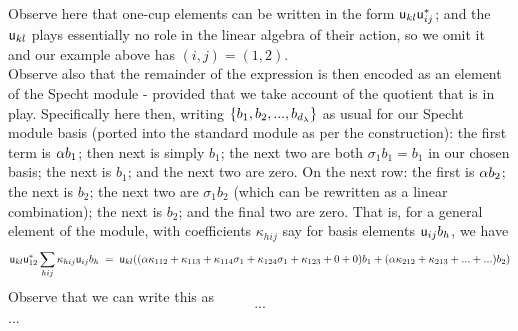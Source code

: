 {\hspace{-2.81cm} 
  \;
    \;
  \;
  \;
   \;  
  \;


\medskip 

\noindent 
Observe here that one-cup elements can be written in the form ${\mathsf u}_{kl} {\mathsf u}_{ij}^*$; 
and the ${\mathsf u}_{kl}$ plays essentially no role in the linear algebra of their action, so 
we omit it and our example above has $(i,j)=(1,2)$. 
\\ 
Observe also that 
the remainder of the expression is then encoded as an element of the Specht module 
- provided that we take account of the quotient that is in play. 
Specifically here then, writing $\{ b_1, b_2 ,..., b_{d_\lambda} \}$ as usual for our Specht module basis (ported into the standard module as per the construction):  
the first term is $\alpha b_1$; 
then next is simply $b_1$; 
the next two are both $\sigma_1 b_1 = b_1$ in our chosen basis; 
the next is $b_1$; and 
the next two are zero. 
On the next row: the first is $\alpha b_2$; 
the next is $b_2$; 
the next two are $\sigma_1 b_2$ (which can be rewritten as a linear combination); 
the next is $b_2$; and the final two are zero. 
That is, for a general element of the module, with coefficients $\kappa_{hij}$ say for basis elements ${\mathsf u}_{ij} b_h$, we have  
\[
{\mathsf u}_{kl} {\mathsf u}_{12}^* \sum_{hij} \kappa_{hij} {\mathsf u}_{ij} b_h \; 
        = \; {\mathsf u}_{kl} ((\alpha\kappa_{112} +\kappa_{113}+\kappa_{114} \sigma_1+\kappa_{124}\sigma_1+\kappa_{123}+0+ 0) b_1  + (\alpha\kappa_{212} +\kappa_{213}+...+ ...) b_2 ) 
\]
Observe that we can write this as 
\[ ...\]
...

\vspace{.53cm} 


\hspace{-2.8231cm} 
 \hspace{.0031cm}
 \hspace{.0041cm}
 \hspace{-.004cm}
 \hspace{.001cm} 
 \hspace{.001cm}
 \hspace{.001cm}

}
